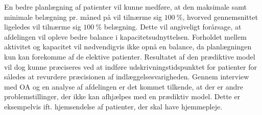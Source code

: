 En bedre planlægning af patienter vil kunne medføre, at den maksimale samt minimale belægning pr. måned på  vil tilnærme sig $100~\%$, hvorved gennemsnittet ligeledes vil tilnærme sig $100~\%$ belægning. Dette vil angiveligt forårsage, at afdelingen vil opleve bedre balance i kapacitetsudnyttelsen. Forholdet mellem aktivitet og kapacitet vil nødvendigvis ikke opnå en balance, da planlægningen kun kan forekomme af de elektive patienter. Resultatet af den prædiktive model vil dog kunne præciseres ved at indføre udskrivningstidspunktet for patienter for således at revurdere præcisionen af indlæggelsesvarigheden.
Gennem interview med OA og en analyse af afdelingen er det kommet tilkende, at der er andre problemstillinger, der ikke kan afhjælpes med en prædiktiv model. Dette er eksempelvis ift. hjemsendelse af patienter, der skal have hjemmepleje.
